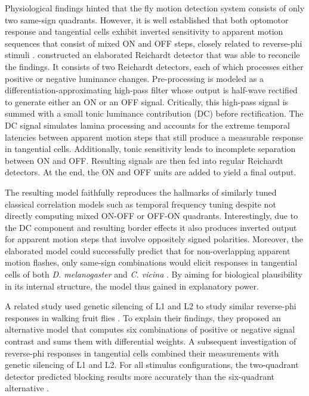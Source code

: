 Physiological findings hinted that the fly motion detection system consists of only two same-sign quadrants. However, it is well established that both optomotor response and tangential cells exhibit inverted sensitivity to apparent motion sequences that consist of mixed ON and OFF steps, closely related to reverse-phi stimuli \citep{Hassenstein:1956fa,Egelhaaf:1992wh,Clark:2011gw}. \citet{Eichner:2011ic} constructed an elaborated Reichardt detector that was able to reconcile the findings. It consists of two Reichardt detectors, each of which processes either positive or negative luminance changes. Pre-processing is modeled as a differentiation-approximating high-pass filter whose output is half-wave rectified to generate either an ON or an OFF signal. Critically, this high-pass signal is summed with a small tonic luminance contribution (DC) before rectification. The DC signal simulates lamina processing \citep{Kern:2000a} and accounts for the extreme temporal latencies between apparent motion steps that still produce a measurable response in tangential cells. Additionally, tonic sensitivity leads to incomplete separation between ON and OFF. Resulting signals are then fed into regular Reichardt detectors. At the end, the ON and OFF units are added to yield a final output.

The resulting model faithfully reproduces the hallmarks of similarly tuned classical correlation models such as temporal frequency tuning despite not directly computing mixed ON-OFF or OFF-ON quadrants. Interestingly, due to the DC component and resulting border effects it also produces inverted output for apparent motion steps that involve oppositely signed polarities. Moreover, the elaborated model could successfully predict that for non-overlapping apparent motion flashes, only same-sign combinations would elicit responses in tangential cells of both \textit{D. melanogaster} and \textit{C. vicina} \citep[see also][]{Franceschini:1989aa}. By aiming for biological plausibility in its internal structure, the model thus gained in explanatory power.

A related study used genetic silencing of L1 and L2 to study similar reverse-phi responses in walking fruit flies \citep{Clark:2011gw}. To explain their findings, they proposed an alternative model that computes six combinations of positive or negative signal contrast and sums them with differential weights. A subsequent investigation of reverse-phi responses in tangential cells combined their measurements with genetic silencing of L1 and L2. For all stimulus configurations, the two-quadrant detector predicted blocking results more accurately than the six-quadrant alternative \citep{Joesch:2013ew}.


